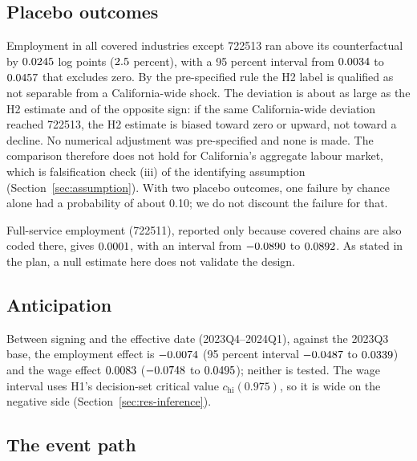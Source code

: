 \subsection{Placebo outcomes}
\label{sec:rob-placebo}

Employment in all covered industries except 722513 ran above its counterfactual by
$0.0245$ log points ($2.5$ percent), with a 95 percent interval from $0.0034$
to $0.0457$ that excludes zero. By the pre-specified rule the H2 label is qualified as not
separable from a California-wide shock. The deviation is about as large as the H2 estimate and of
the opposite sign: if the same California-wide deviation reached 722513, the H2 estimate is biased
toward zero or upward, not toward a decline. No numerical adjustment was pre-specified and none is
made. The comparison therefore does not hold for California's aggregate labour market, which is
falsification check (iii) of the identifying assumption (Section~\ref{sec:assumption}). With two
placebo outcomes, one failure by chance alone had a probability of about 0.10; we do not discount
the failure for that.

Full-service employment (722511), reported only because covered chains are also coded there, gives
$0.0001$, with an interval from $-0.0890$ to $0.0892$. As stated in
the plan, a null estimate here does not validate the design.

\subsection{Anticipation}
\label{sec:rob-anticip}

Between signing and the effective date (2023Q4--2024Q1), against the 2023Q3 base, the employment
effect is $-0.0074$ (95 percent interval $-0.0487$ to $0.0339$) and the wage
effect $0.0083$ ($-0.0748$ to $0.0495$); neither is tested. The wage interval
uses H1's decision-set critical value $c_{\mathrm{hi}}(0.975)$, so it is wide on the negative side
(Section~\ref{sec:res-inference}).

\subsection{The event path}
\label{sec:rob-event}

